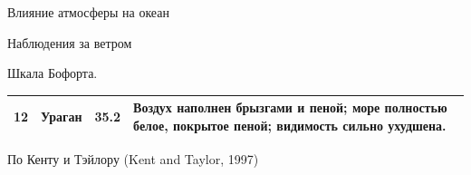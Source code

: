 \begin{chapter}{Влияние атмосферы на океан}
\begin{section}{Наблюдения за ветром}
\begin{paragraph}{Шкала Бофорта.}
\begin{table}
\begin{footnotesize}
\begin{tabular}{|p{}|p{}|p{}|p{}|}
12 & Ураган & 35.2 &
Воздух наполнен брызгами и пеной; море полностью белое, покрытое
пеной; видимость сильно ухудшена. \\
\hline
\end{tabular}
\end{footnotesize}
\centerline{По Кенту и Тэйлору (Kent and Taylor, 1997)}
\end{table}
%

\end{paragraph}
\end{section}
\end{chapter}
